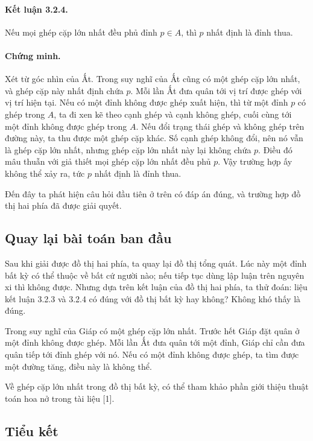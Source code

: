 \documentclass[11pt]{article}
\begin{document}
\paragraph{Kết luận 3.2.4.}
Nếu mọi ghép cặp lớn nhất đều phủ đỉnh \(p\in A\), thì \(p\) nhất định là
đỉnh thua.

\paragraph{Chứng minh.}
Xét từ góc nhìn của Ất. Trong suy nghĩ của Ất cũng có một ghép cặp lớn nhất,
và ghép cặp này nhất định chứa \(p\). Mỗi lần Ất đưa quân tới vị trí được ghép
với vị trí hiện tại. Nếu có một đỉnh không được ghép xuất hiện, thì từ một
đỉnh \(p\) có ghép trong \(A\), ta đi xen kẽ theo cạnh ghép và cạnh không
ghép, cuối cùng tới một đỉnh không được ghép trong \(A\). Nếu đổi trạng thái
ghép và không ghép trên đường này, ta thu được một ghép cặp khác. Số cạnh ghép
không đổi, nên nó vẫn là ghép cặp lớn nhất, nhưng ghép cặp lớn nhất này lại
không chứa \(p\). Điều đó mâu thuẫn với giả thiết mọi ghép cặp lớn nhất đều
phủ \(p\). Vậy trường hợp ấy không thể xảy ra, tức \(p\) nhất định là đỉnh
thua.

Đến đây ta phát hiện câu hỏi đầu tiên ở trên có đáp án đúng, và trường hợp đồ
thị hai phía đã được giải quyết.

\subsection{Quay lại bài toán ban đầu}

Sau khi giải được đồ thị hai phía, ta quay lại đồ thị tổng quát. Lúc này một
đỉnh bất kỳ có thể thuộc về bất cứ người nào; nếu tiếp tục dùng lập luận trên
nguyên xi thì không được. Nhưng dựa trên kết luận của đồ thị hai phía, ta thử
đoán: liệu kết luận 3.2.3 và 3.2.4 có đúng với đồ thị bất kỳ hay không? Không
khó thấy là đúng.

Trong suy nghĩ của Giáp có một ghép cặp lớn nhất. Trước hết Giáp đặt quân ở
một đỉnh không được ghép. Mỗi lần Ất đưa quân tới một đỉnh, Giáp chỉ cần đưa
quân tiếp tới đỉnh ghép với nó. Nếu có một đỉnh không được ghép, ta tìm được
một đường tăng, điều này là không thể.

Về ghép cặp lớn nhất trong đồ thị bất kỳ, có thể tham khảo phần giới thiệu
thuật toán hoa nở trong tài liệu [1].

\subsection{Tiểu kết}
\end{document}
